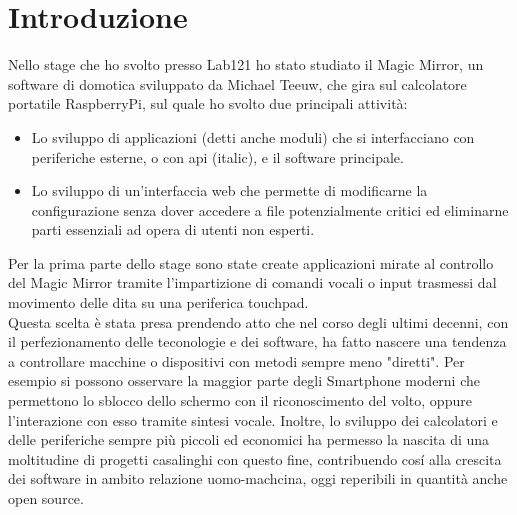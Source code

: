\chapter*{Introduzione}

Nello stage che ho svolto presso Lab121 ho stato studiato il Magic Mirror, un software di domotica sviluppato da Michael Teeuw,
che gira sul calcolatore portatile RaspberryPi\cite{Raspberry}, sul quale ho svolto due principali attivit\`a:\\
\begin{itemize}
\item Lo sviluppo di applicazioni (detti anche moduli) che si interfacciano con periferiche esterne, o con api (italic), e il software
principale.
\item Lo sviluppo di un'interfaccia web che permette di modificarne la configurazione senza dover accedere
a file potenzialmente critici ed eliminarne parti essenziali ad opera di utenti non esperti.\\[1\baselineskip]
\end{itemize}
Per la prima parte dello stage sono state create applicazioni mirate al controllo del
Magic Mirror tramite l'impartizione di comandi vocali o input trasmessi dal movimento delle dita su
una periferica touchpad.\\
Questa scelta \`e stata presa prendendo atto che nel corso
degli ultimi decenni, con il perfezionamento delle teconologie e dei software, ha fatto nascere
una tendenza a controllare macchine o dispositivi con metodi sempre meno "diretti".
Per esempio si possono osservare la maggior parte degli Smartphone moderni che permettono lo sblocco dello schermo con
il riconoscimento del volto, oppure l'interazione con esso tramite sintesi vocale.
Inoltre, lo sviluppo dei calcolatori e delle periferiche sempre pi\`u piccoli ed economici ha permesso
la nascita di una moltitudine di progetti casalinghi con questo fine, contribuendo cos\'i
alla crescita dei software in ambito relazione uomo-machcina, oggi reperibili in quantità anche open source.
\\[2\baselineskip]
